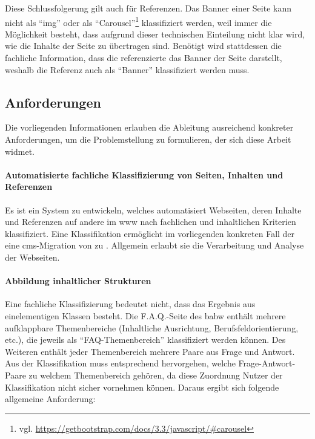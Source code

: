         Diese Schlussfolgerung gilt auch für Referenzen.
        Das Banner einer Seite kann nicht als "`img"'
        oder als "`Carousel"'\footnote{vgl. \url{https://getbootstrap.com/docs/3.3/javascript/\#carousel}}
        klassifiziert werden, weil immer die Möglichkeit besteht,
        dass aufgrund dieser technischen Einteilung nicht klar wird,
        wie die Inhalte der Seite zu übertragen sind.
        Benötigt wird stattdessen die fachliche Information,
        dass die referenzierte {\resource} das Banner der Seite darstellt,
        weshalb die Referenz auch als "`Banner"' klassifiziert werden muss.

    \subsection{Anforderungen}
        Die vorliegenden Informationen erlauben
        die Ableitung ausreichend konkreter Anforderungen,
        um die Problemstellung zu formulieren, der sich diese Arbeit widmet.

        \paragraph*{Automatisierte fachliche Klassifizierung von Seiten, Inhalten und Referenzen}
        Es ist ein System zu entwickeln, welches automatisiert Webseiten,
        deren Inhalte und Referenzen auf andere {\resources} im \gls{www}
        nach fachlichen und inhaltlichen Kriterien klassifiziert.
        Eine Klassifikation ermöglicht im vorliegenden konkreten Fall
        der {\fernUni} eine \gls{cms}-Migration von {\wordpress} zu {\imperia}.
        Allgemein erlaubt sie die Verarbeitung und Analyse der Webseiten.

        \paragraph*{Abbildung inhaltlicher Strukturen}
        Eine fachliche Klassifizierung bedeutet nicht,
        dass das Ergebnis aus einelementigen Klassen besteht.
        Die F.A.Q.-Seite des \gls{babw} enthält mehrere aufklappbare
        Themenbereiche (Inhaltliche Ausrichtung, Berufsfeldorientierung, etc.),
        die jeweils als "`FAQ-Themenbereich"' klassifiziert werden können.
        Des Weiteren enthält jeder Themenbereich mehrere Paare aus Frage und Antwort.
        Aus der Klassifikation muss entsprechend hervorgehen,
        welche Frage-Antwort-Paare zu welchem Themenbereich gehören,
        da diese Zuordnung Nutzer der Klassifikation nicht sicher vornehmen können.
        Daraus ergibt sich folgende allgemeine Anforderung:

